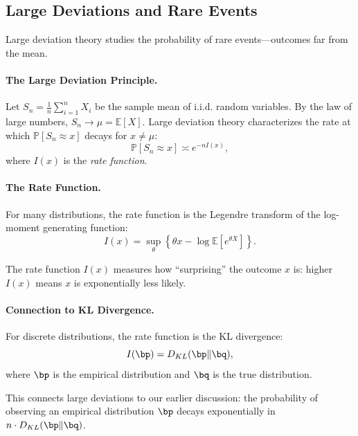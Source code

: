 \subsection{Large Deviations and Rare Events}
\label{subsec:ac-adv-large-dev}

Large deviation theory studies the probability of rare events---outcomes far from the mean.

\paragraph{The Large Deviation Principle.}
Let $S_n = \frac{1}{n} \sum_{i=1}^{n} X_i$ be the sample mean of i.i.d. random variables. By the law of large numbers, $S_n \to \mu = \mathbb{E}[X]$. Large deviation theory characterizes the rate at which $\mathbb{P}[S_n \approx x]$ decays for $x \neq \mu$:
\begin{equation}
\mathbb{P}[S_n \approx x] \asymp e^{-n I(x)},
\label{eq:ac-adv-ldp}
\end{equation}
where $I(x)$ is the \emph{rate function}.

\paragraph{The Rate Function.}
For many distributions, the rate function is the Legendre transform of the log-moment generating function:
\begin{equation}
I(x) = \sup_{\theta} \left\{ \theta x - \log \mathbb{E}[e^{\theta X}] \right\}.
\label{eq:ac-adv-rate}
\end{equation}

The rate function $I(x)$ measures how ``surprising'' the outcome $x$ is: higher $I(x)$ means $x$ is exponentially less likely.

\paragraph{Connection to KL Divergence.}
For discrete distributions, the rate function is the KL divergence:
\begin{equation}
I(\bp) = D_{KL}(\bp \| \bq),
\label{eq:ac-adv-rate-kl}
\end{equation}
where $\bp$ is the empirical distribution and $\bq$ is the true distribution.

This connects large deviations to our earlier discussion: the probability of observing an empirical distribution $\bp$ decays exponentially in $n \cdot D_{KL}(\bp \| \bq)$.

